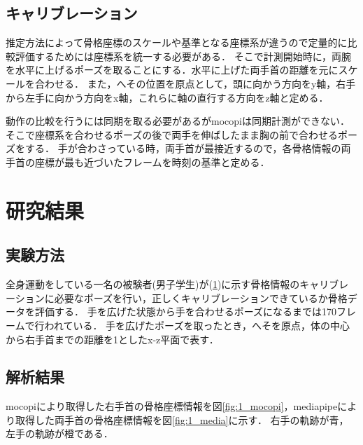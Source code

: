 \documentclass[a4j, fleqn, 12pt]{jsreport}
\begin{document}
\section{キャリブレーション}\label{kyari}
推定方法によって骨格座標のスケールや基準となる座標系が違うので定量的に比較評価するためには座標系を統一する必要がある．
そこで計測開始時に，両腕を水平に上げるポーズを取ることにする．水平に上げた両手首の距離を元にスケールを合わせる．
また，へその位置を原点として，頭に向かう方向をy軸，右手から左手に向かう方向をx軸，これらに軸の直行する方向をz軸と定める．

動作の比較を行うには同期を取る必要があるがmocopiは同期計測ができない．
そこで座標系を合わせるポーズの後で両手を伸ばしたまま胸の前で合わせるポーズをする．
手が合わさっている時，両手首が最接近するので，各骨格情報の両手首の座標が最も近づいたフレームを時刻の基準と定める．

\chapter{研究結果}
\section{実験方法}
全身運動をしている一名の被験者(男子学生)が(\ref{kyari})に示す骨格情報のキャリブレーションに必要なポーズを行い，正しくキャリブレーションできているか骨格データを評価する．
手を広げた状態から手を合わせるポーズになるまでは170フレームで行われている．
手を広げたポーズを取ったとき，へそを原点，体の中心から右手首までの距離を1としたx-z平面で表す．
\section{解析結果}
mocopiにより取得した右手首の骨格座標情報を図\ref{fig:1_mocopi}，mediapipeにより取得した両手首の骨格座標情報を図\ref{fig:1_media}に示す．
右手の軌跡が青，左手の軌跡が橙である．
\end{document}
